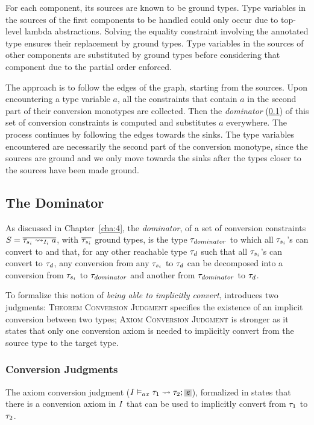 For each component, its sources are known to be ground types. Type variables in the sources of the first components to be handled could only occur due to top-level lambda abstractions. Solving the equality constraint involving the annotated type ensures their replacement by ground types. Type variables in the sources of other components are substituted by ground types before considering that component due to the partial order enforced.

The approach is to follow the edges of the graph, starting from the sources. Upon encountering a type variable $a$, all the constraints that contain $a$ in the second part of their conversion monotypes are collected. Then the \textit{dominator} (\ref{dominator}) of this set of conversion constraints is computed and substitutes $a$ everywhere. The process continues by following the edges towards the sinks. The type variables encountered are necessarily the second part of the conversion monotype, since the sources are ground and we only move towards the sinks after the types closer to the sources have been made ground.

\subsection{The Dominator}
\label{dominator}
As discussed in Chapter~\ref{cha:4}, the \textit{dominator}, of a set of conversion constraints $S=\overline{\convX{\imEnv_i}{\type_{s_i}}{a}}$, with $\overline{\type_{s_i}}$ ground types, is the type $\type_{dominator}$ to which all $\type_{s_i}$'s can convert to and that, for any other reachable type $\type_d$ such that  all $\type_{s_i}$'s can convert to $\type_d$, any conversion from any $\type_{s_i}$ to $\type_d$ can be decomposed into a conversion from $\type_{s_i}$ to $\type_{dominator}$ and another from $\type_{dominator}$ to $\type_d$.

To formalize this notion of \textit{being able to implicitly convert},  introduces two judgments: \textsc{Theorem Conversion Judgment} specifies the existence of an implicit conversion between two types; \textsc{Axiom Conversion Judgment} is stronger as it states that only one conversion axiom is needed to implicitly convert from the source type to the target type.


\subsubsection{Conversion Judgments}
\label{susec}
The axiom conversion judgment ($\convax{\imEnv}{\type_1}{\type_2}{\term}$), formalized in  states that there is a conversion axiom in $\imEnv$ that can be used to implicitly convert from $\type_1$ to $\type_2$.

